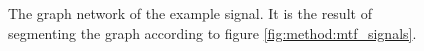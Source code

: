 \begin{figure}
	\centering
	\caption{The graph network of the example signal. It is the result of segmenting the graph according to figure \ref{fig:method:mtf_signals}.}
	\label{fig:method:markov_chain}
\end{figure}
